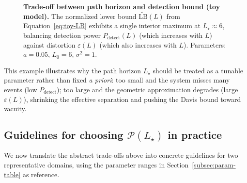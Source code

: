 \documentclass[11pt]{article}
\begin{document}
\begin{figure}[H]
\centering
{}
\caption{\textbf{Trade-off between path horizon and detection bound (toy model).} 
The normalized lower bound $\widetilde{\mathrm{LB}}(L)$ from 
Equation~\eqref{eq:toy-LB} exhibits a single interior maximum at 
$L_\star \approx 6$, balancing detection power $P_{\mathrm{detect}}(L)$ 
(which increases with $L$) against distortion $\varepsilon(L)$ (which also 
increases with $L$). Parameters: $a=0.05$, $L_0=6$, $\sigma^2=1$.}
\label{fig:path-horizon}
\end{figure}

This example illustrates why the path horizon $L_\star$ should be treated as a tunable parameter
rather than fixed \emph{a priori}: too small and the system misses many events (low
$P_{\mathrm{detect}}$); too large and the geometric approximation degrades (large $\varepsilon(L)$), shrinking
the effective separation and pushing the Davis bound toward vacuity.

\subsection{Guidelines for choosing $\mathcal{P}(L_\star)$ in practice}
\label{subsec:path-guidelines}

We now translate the abstract trade-offs above into concrete guidelines for two representative
domains, using the parameter ranges in Section~\ref{subsec:param-table} as reference.
\end{document}
